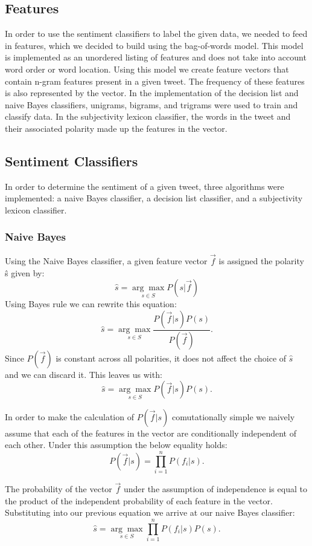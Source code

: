 \documentclass[11pt]{article}
\begin{document}
\subsection{Features}
In order to use the sentiment classifiers to label the given data, we needed to feed in features, which we decided to build using the bag-of-words model. This model is implemented as an unordered listing of features and does not take into account word order or word location. Using this model we create feature vectors that contain n-gram features present in a given tweet. The frequency of these features is also represented by the vector. In the implementation of the decision list and naive Bayes classifiers, unigrams, bigrams, and trigrams were used to train and classify data. In the subjectivity lexicon classifier, the words in the tweet and their associated polarity made up the features in the vector. 

\subsection{Sentiment Classifiers}
In order to determine the sentiment of a given tweet, three algorithms were implemented: a naive Bayes classifier, a decision list classifier, and a subjectivity lexicon classifier.
\subsubsection*{Naive Bayes}
Using the Naive Bayes classifier, a given feature vector $\vec{f}$ is assigned
the polarity \^{s} given by: 
$$\hat{s} = \underset{{s}\in{S}}{\arg\max}P(s|\vec{f})$$
Using Bayes rule we can rewrite this equation:
\[\hat{s} = \underset{{s}\in{S}}{\arg\max}{\frac{P(\vec{f}|s)P(s)}{P(\vec{f})}}.\]
Since $P(\vec{f})$ is constant across all polarities, it
does not affect the choice of $\hat{s}$ and we can discard it. This leaves us with:
\[\hat{s} = \underset{{s}\in{S}}{\arg\max}{P(\vec{f}|s)P(s)}.\]

In order to make the calculation of $P(\vec{f}|s)$ comutationally simple we naively assume that each of the features in the vector are conditionally independent of each other. Under this assumption the below equality holds:
\[P(\vec{f}|s) = \prod_{i=1}^n P(f_i|s).\]

The probability of the vector $\vec{f}$ under the assumption of independence is equal to the product of the independent probability of each feature in the vector. Substituting into our previous equation we arrive at our naive Bayes classifier:
\[\hat{s} = \underset{s \in S}{\arg\max}{{\prod_{i=1}^n}P(f_i|s)}P(s).\]
\end{document}
